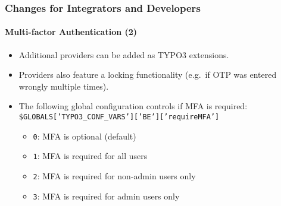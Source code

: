 %

\begin{frame}[fragile]
	\frametitle{Changes for Integrators and Developers}
	\framesubtitle{Multi-factor Authentication (2)}

	\begin{itemize}

		\item Additional providers can be added as TYPO3 extensions.

		\item Providers also feature a locking functionality
			(e.g.\ if OTP was entered wrongly multiple times).

		\item The following global configuration controls if MFA is required:\newline
			\smaller\texttt{\$GLOBALS['TYPO3\_CONF\_VARS']['BE']['requireMFA']}\normalsize

			\begin{itemize}
				\item \texttt{0}: MFA is optional (default)
				\item \texttt{1}: MFA is required for all users
				\item \texttt{2}: MFA is required for non-admin users only
				\item \texttt{3}: MFA is required for admin users only
			\end{itemize}

	\end{itemize}

\end{frame}

